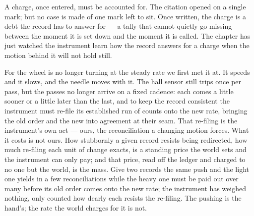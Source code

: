 %
%
%

\noindent A charge, once entered, must be accounted for. The citation opened on a single mark; but no case
is made of one mark left to sit. Once written, the charge is a debt the record has to answer for --- a tally
that cannot quietly go missing between the moment it is set down and the moment it is called. The chapter has
just watched the instrument learn how the record answers for a charge when the motion behind it will not hold
still.

For the wheel is no longer turning at the steady rate we first met it at. It speeds and it slows, and the
needle moves with it. The hall sensor still trips once per pass, but the passes no longer arrive on a fixed
cadence: each comes a little sooner or a little later than the last, and to keep the record consistent the
instrument must re-file its established run of counts onto the new rate, bringing the old order and the new into
agreement at their seam. That re-filing is the instrument's own act --- ours, the reconciliation a changing
motion forces. What it costs is not ours. How stubbornly a given record resists being redirected, how much
re-filing each unit of change exacts, is a standing price the world sets and the instrument can only pay; and
that price, read off the ledger and charged to no one but the world, is the mass. Give two records the same
push and the light one yields in a few reconciliations while the heavy one must be paid out over many before its
old order comes onto the new rate; the instrument has weighed nothing, only counted how dearly each resists the
re-filing. The pushing is the hand's; the rate the world charges for it is not.

